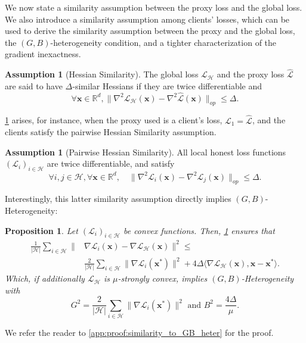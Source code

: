 \documentclass{article}
\def\vx{{\bm{x}}}
\newcommand{\R}{\mathbb{R}}
\newcommand{\cH}{\mathcal{H}}
\newcommand{\cL}{\mathcal{L}}
\theoremstyle{plain}
\newtheorem{proposition}[theorem]{Proposition}
\theoremstyle{definition}
\newtheorem{assumption}[theorem]{Assumption}
\theoremstyle{remark}
\begin{document}
We now state a similarity assumption between the proxy loss and the global loss. We also introduce a similarity assumption among clients' losses, which can be used to derive the similarity assumption between the proxy and the global loss, the $(G,B)$-heterogeneity condition, and a tighter characterization of the gradient inexactness.

\begin{assumption}[Hessian Similarity]
\label{asmpt:Hessian_Similarity}
    The global loss $\cL_{\cH}$ and the proxy loss $\hat{\cL}$ are said to have $\Delta$-similar Hessians if they are twice differentiable and
    \[
    \forall \vx \in \R^d, \|\nabla^2 \cL_{\cH}(\vx) - \nabla^2 \hat{\cL}(\vx)\|_{op} \le \Delta.
    \]
\end{assumption}

\cref{asmpt:Hessian_Similarity} arises, for instance, when the proxy used is a client's loss, $\cL_{1} = \hat{\cL}$, and the clients satisfy the pairwise Hessian Similarity assumption.

\begin{assumption}[Pairwise Hessian Similarity]
\label{asmpt:Pariwise_Hessian_Similarity}
    All local honest loss functions $(\cL_i)_{i \in \cH}$ are twice differentiable, and satisfy 
    \[
    \forall i,j \in\cH,\forall \vx \in \R^d, \quad \|\nabla^2 \cL_{i}(\vx) - \nabla^2 \cL_{j}(\vx)\|_{op} \le \Delta.
    \]
\end{assumption}

Interestingly, this latter similarity assumption directly implies $(G,B)$-Heterogeneity:

\begin{proposition}
    \label{prop:similarity_to_GB_heter}
    Let $(\cL_i)_{i\in\cH}$ be convex functions. Then, \cref{asmpt:Pariwise_Hessian_Similarity} ensures that
    \begin{align*}
    \frac{1}{|\cH|}\sum_{i\in\cH}\|&\nabla \cL_i(\vx)-\nabla \cL_{\cH}(\vx)\|^2 \le\\ 
    &\frac{2}{|\cH|}\sum_{i\in\cH}\|\nabla \cL_i(\vx^*)\|^2 + 4\Delta \langle \nabla \cL_{\cH}(\vx), \vx - \vx^*\rangle.
    \end{align*}
    Which, if additionally $\cL_{\cH}$ is $\mu$-strongly convex, implies $(G,B)$-Heterogeneity with 
    \[
    G^2 = \frac{2}{|\cH|}\sum_{i\in\cH}\|\nabla \cL_i(\vx^*)\|^2 \text{ and } B^2 = \frac{4\Delta}{\mu}.
    \]
\end{proposition}
We refer the reader to \cref{app:proof:similarity_to_GB_heter} for the proof.
\end{document}
